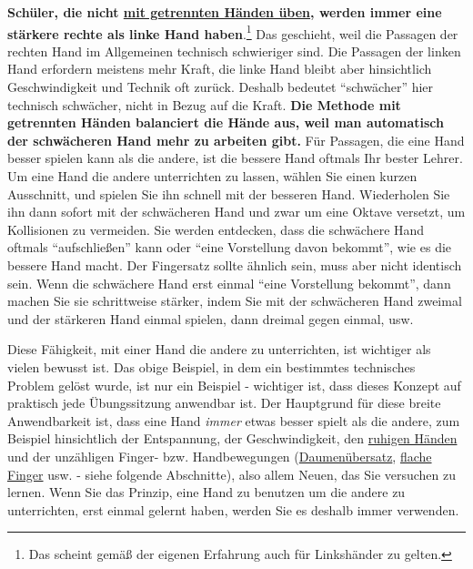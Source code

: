 \textbf{Schüler, die nicht \hyperlink{c1ii7}{mit getrennten Händen üben}, werden immer eine stärkere rechte als linke Hand haben}.\footnote{Das scheint gemäß der eigenen Erfahrung auch für Linkshänder zu gelten.}
Das geschieht, weil die Passagen der rechten Hand im Allgemeinen technisch schwieriger sind.
Die Passagen der linken Hand erfordern meistens mehr Kraft, die linke Hand bleibt aber hinsichtlich Geschwindigkeit und Technik oft zurück.
Deshalb bedeutet \enquote{schwächer} hier technisch schwächer, nicht in Bezug auf die Kraft.
\textbf{Die Methode mit getrennten Händen balanciert die Hände aus, weil man automatisch der schwächeren Hand mehr zu arbeiten gibt.}
Für Passagen, die eine Hand besser spielen kann als die andere, ist die bessere Hand oftmals Ihr bester Lehrer.
Um eine Hand die andere unterrichten zu lassen, wählen Sie einen kurzen Ausschnitt, und spielen Sie ihn schnell mit der besseren Hand.
Wiederholen Sie ihn dann sofort mit der schwächeren Hand und zwar um eine Oktave versetzt, um Kollisionen zu vermeiden.
Sie werden entdecken, dass die schwächere Hand oftmals \enquote{aufschließen} kann oder \enquote{eine Vorstellung davon bekommt}, wie es die bessere Hand macht.
Der Fingersatz sollte ähnlich sein, muss aber nicht identisch sein.
Wenn die schwächere Hand erst einmal \enquote{eine Vorstellung bekommt}, dann machen Sie sie schrittweise stärker, indem Sie mit der schwächeren Hand zweimal und der stärkeren Hand einmal spielen, dann dreimal gegen einmal, usw.

Diese Fähigkeit, mit einer Hand die andere zu unterrichten, ist wichtiger als vielen bewusst ist.
Das obige Beispiel, in dem ein bestimmtes technisches Problem gelöst wurde, ist nur ein Beispiel - wichtiger ist, dass dieses Konzept auf praktisch jede Übungssitzung anwendbar ist.
Der Hauptgrund für diese breite Anwendbarkeit ist, dass eine Hand \textit{immer} etwas besser spielt als die andere, zum Beispiel hinsichtlich der Entspannung, der Geschwindigkeit, den \hyperlink{ruhig}{ruhigen Händen} und der unzähligen Finger- bzw. Handbewegungen (\hyperlink{c1iii5a}{Daumenübersatz}, \hyperlink{c1iii4b}{flache Finger} usw. - siehe folgende Abschnitte), also allem Neuen, das Sie versuchen zu lernen.
Wenn Sie das Prinzip, eine Hand zu benutzen um die andere zu unterrichten, erst einmal gelernt haben, werden Sie es deshalb immer verwenden.



